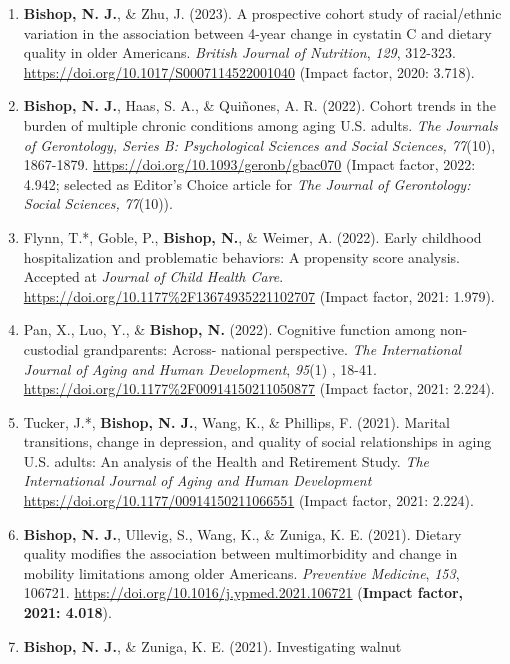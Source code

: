 \documentclass[
]{article}
\begin{document}
\begin{enumerate}
\def\labelenumi{\arabic{enumi}.}
\item
  \textbf{Bishop, N. J.}, \& Zhu, J. (2023). A prospective cohort study
  of racial/ethnic variation in the association between 4-year change in
  cystatin C and dietary quality in older Americans. \emph{British
  Journal of Nutrition}, \emph{129}, 312-323.
  \url{https://doi.org/10.1017/S0007114522001040} (Impact factor, 2020:
  3.718).
\item
  \textbf{Bishop, N. J.}, Haas, S. A., \& Quiñones, A. R. (2022). Cohort
  trends in the burden of multiple chronic conditions among aging U.S.
  adults. \emph{The Journals of Gerontology, Series B: Psychological
  Sciences and Social Sciences, 77}(10), 1867-1879.
  \url{https://doi.org/10.1093/geronb/gbac070} (Impact factor, 2022:
  4.942; selected as Editor's Choice article for \emph{The Journal of
  Gerontology: Social Sciences,} \emph{77}(10)).
\item
  Flynn, T.*, Goble, P., \textbf{Bishop, N.}, \& Weimer, A. (2022).
  Early childhood hospitalization and problematic behaviors: A
  propensity score analysis. Accepted at \emph{Journal of Child Health
  Care}. \url{https://doi.org/10.1177\%2F13674935221102707} (Impact
  factor, 2021: 1.979).
\item
  Pan, X., Luo, Y., \& \textbf{Bishop, N.} (2022). Cognitive function
  among non-custodial grandparents: Across- national perspective.
  \emph{The International Journal of Aging and Human Development},
  \emph{95}(1) , 18-41.
  \url{https://doi.org/10.1177\%2F00914150211050877} (Impact factor,
  2021: 2.224).
\item
  Tucker, J.*, \textbf{Bishop, N. J.}, Wang, K., \& Phillips, F. (2021).
  Marital transitions, change in depression, and quality of social
  relationships in aging U.S. adults: An analysis of the Health and
  Retirement Study. \emph{The International Journal of Aging and Human
  Development} \url{https://doi.org/10.1177/00914150211066551} (Impact
  factor, 2021: 2.224).
\item
  \textbf{Bishop, N. J.}, Ullevig, S., Wang, K., \& Zuniga, K. E.
  (2021). Dietary quality modifies the association between
  multimorbidity and change in mobility limitations among older
  Americans. \emph{Preventive Medicine}, \emph{153}, 106721.
  \url{https://doi.org/10.1016/j.ypmed.2021.106721} (\textbf{Impact
  factor, 2021: 4.018}).
\item
  \textbf{Bishop, N. J.}, \& Zuniga, K. E. (2021). Investigating walnut

\end{enumerate}
\end{document}
